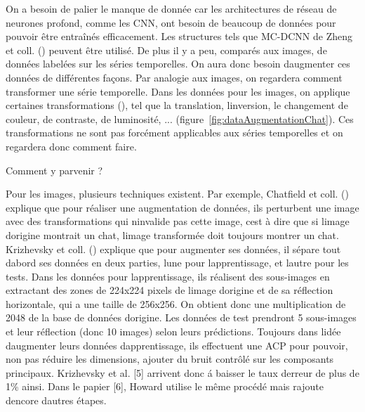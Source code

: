 \documentclass[11pt]{sdm}
\begin{document}
			On a besoin de palier le manque de donn\'ee car les architectures de r\'eseau de neurones profond, comme les CNN, ont besoin de beaucoup de donn\'ees pour pouvoir \^etre entra\^in\'es efficacement. Les structures tels que MC-DCNN de Zheng et coll. (\cite{zheng2014time}) peuvent \^etre utilis\'e.
			De plus il y a peu, compar\'es aux images, de donn\'ees label\'ees sur les s\'eries temporelles. On aura donc besoin d\textquotesingle augmenter ces donn\'ees de diff\'erentes fa\c cons.
			Par analogie aux images, on regardera comment transformer une s\'erie temporelle. Dans les donn\'ees pour les images, on applique certaines transformations (\cite{krizhevsky2012imagenet,howard2013some}), tel que la translation, l\textquotesingle inversion, le changement de couleur, de contraste, de luminosit\'e, ... (figure~\ref{fig:dataAugmentationChat}). Ces transformations ne sont pas forc\'ement applicables aux s\'eries temporelles et on regardera donc comment faire.

			\medbreak

			\begin{itshape}{Comment y parvenir ?}\end{itshape}
			
			Pour les images, plusieurs techniques existent. Par exemple, Chatfield et coll. (\cite{chatfield2014return}) explique que pour r\'ealiser une augmentation de donn\'ees, ils perturbent une image avec des transformations qui n\textquotesingle invalide pas cette image, c\textquotesingle est \`a dire que si l\textquotesingle image d\textquotesingle origine montrait un chat, l\textquotesingle image transform\'ee doit toujours montrer un chat. Krizhevsky et coll. (\cite{krizhevsky2012imagenet}) explique que pour augmenter ses donn\'ees, il s\'epare tout d\textquotesingle abord ses donn\'ees en deux parties, l\textquotesingle une pour l\textquotesingle apprentissage, et l\textquotesingle autre pour les tests. Dans les donn\'ees pour l\textquotesingle apprentissage, ils r\'ealisent des sous-images en extractant des zones de 224x224 pixels de l\textquotesingle image d\textquotesingle origine et de sa r\'eflection horizontale, qui a une taille de 256x256. On obtient donc une multiplication de 2048 de la base de donn\'ees d\textquotesingle origine. Les donn\'ees de test prendront 5 sous-images et leur r\'eflection (donc 10 images) selon leurs pr\'edictions. Toujours dans l\textquotesingle id\'ee d\textquotesingle augmenter leurs donn\'ees d\textquotesingle apprentissage, ils effectuent une ACP pour pouvoir, non pas r\'eduire les dimensions, ajouter du bruit contr\^ol\'e sur les composants principaux. Krizhevsky et al. [5] arrivent donc \'a baisser le taux d\textquotesingle erreur de plus de 1\% ainsi. Dans le papier [6], Howard utilise le m\^eme proc\'ed\'e mais rajoute d\textquotesingle encore d\textquotesingle autres \'etapes. 
\end{document}
